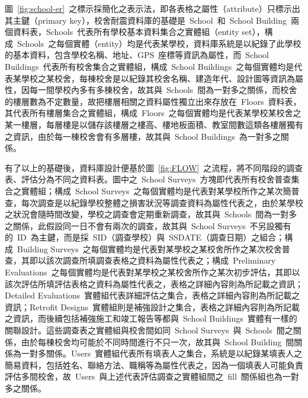 圖~\ref{fig:school-er}~之標示採簡化之表示法，即各表格之屬性（attribute）只標示出其主鍵（primary key），校舍耐震資料庫的基礎是~School~和~School Building~兩個資料表，Schools~代表所有學校基本資料集合之實體組（entity set），構成~Schools~之每個實體（entity）均是代表某學校，資料庫系統是以紀錄了此學校的基本資料，包含學校名稱、地址、GPS~座標等資訊為屬性，而~School Buildings~代表所有校舍集合之實體組，構成~School Buildings~之每個實體均是代表某學校之某校舍，每棟校舍是以紀錄其校舍名稱、建造年代、設計圖等資訊為屬性，因每一間學校內多有多棟校舍，故其與~Schools~間為一對多之關係，而校舍的樓層數為不定數量，故把樓層相關之資料屬性獨立出來存放在~Floors~資料表，其代表所有樓層集合之實體組，構成~Floors~之每個實體均是代表某學校某校舍之某一樓層，每層樓是以儲存該樓層之樓高、樓地板面積、教室間數這類各樓層獨有之資訊，由於每一棟校舍會有多層樓，故其與~School Buildings~為一對多之關係。

有了以上的基礎後，資料庫設計便基於圖~\ref{fig:FLOW}~之流程，將不同階段的調查表、評估分為不同之資料表。圖中之~School Surveys~方塊即代表所有校舍普查集合之實體組；構成~School Surveys~之每個實體均是代表對某學校所作之某次簡普查，每次調查是以紀錄學校整體之損害狀況等調查資料為屬性代表之，由於某學校之狀況會隨時間改變，學校之調查會定期重新調查，故其與~Schools~間為一對多之關係，此假設同一日不會有兩次的調查，故其與~School Surveys~不另設獨有的~ID~為主鍵，而是採~SID（調查學校）與~SSDATE（調查日期）之組合；構成~Building Surveys~之每個實體均是代表對某學校之某校舍所作之某次校舍普查，其即以該次調查所填調查表格之資料為屬性代表之；構成~Preliminary Evaluations~之每個實體均是代表對某學校之某校舍所作之某次初步評估，其即以該次評估所填評估表格之資料為屬性代表之，表格之詳細內容則為所記載之資訊；Detailed Evaluations~實體組代表詳細評估之集合，表格之詳細內容則為所記載之資訊；Retrofit Designs~實體組則是補強設計之集合，表格之詳細內容則為所記載之資訊，而後續包括補強施工和竣工報告等都與~School Buildings~實體有一樣的關聯設計。這些調查表之實體組與校舍間如同~School Surveys~與~Schools~間之關係，由於每棟校舍均可能於不同時間進行不只一次，故其與~School Building~間關係為一對多關係。Users~實體組代表所有填表人之集合，系統是以紀錄某填表人之簡易資料，包括姓名、聯絡方法、職稱等為屬性代表之，因為一個填表人可能負責評估多間校舍，故~Users~與上述代表評估調查之實體組間之~fill~關係組也為一對多之關係。







